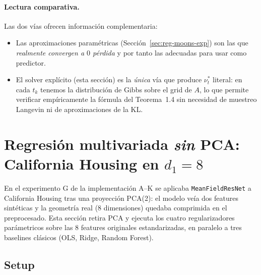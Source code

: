 \documentclass[11pt, a4paper]{article}
\theoremstyle{definition}
\begin{document}
\paragraph{Lectura comparativa.}
Las dos vías ofrecen información complementaria:
\begin{itemize}
  \item Las aproximaciones paramétricas
        (Sección~\ref{sec:reg-moons-exp}) son las que
        \emph{realmente convergen a $0$ pérdida} y por tanto las
        adecuadas para usar como predictor.
  \item El solver explícito (esta sección) es la \emph{única} vía que
        produce $\nu_t^*$ literal: en cada $t_k$ tenemos la
        distribución de Gibbs sobre el grid de $A$, lo que
        permite verificar empíricamente la fórmula del Teorema~1.4
        sin necesidad de muestreo Langevin ni de aproximaciones
        de la KL.
\end{itemize}

\section{Regresión multivariada \emph{sin} PCA: California Housing en
$d_1=8$}
\label{sec:regresion-d8}

En el experimento G de la implementación A--K se aplicaba
\texttt{MeanFieldResNet} a California Housing tras una proyección
PCA(2): el modelo veía dos features sintéticas y la geometría
real (8 dimensiones) quedaba comprimida en el preprocesado. Esta
sección retira PCA y ejecuta los cuatro regularizadores
parámetricos sobre las 8 features originales estandarizadas, en
paralelo a tres baselines clásicos (OLS, Ridge, Random Forest).

\subsection{Setup}
\label{sec:reg-d8-setup}
\end{document}

